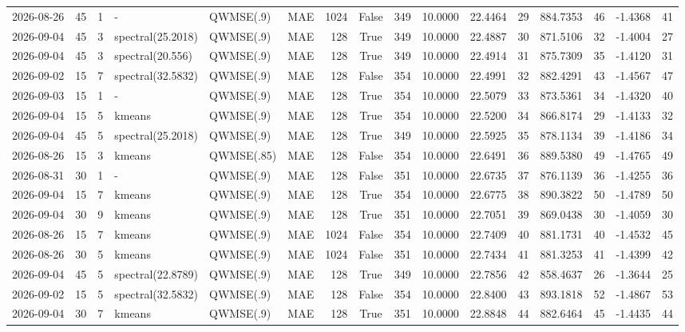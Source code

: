 \documentclass[10pt]{article}
\begin{document}
\begin{landscape}
\begin{longtable}{@{}lrrlllrcrrrrrrrr@{}}
2026-08-26 & 45 & 1 & - & QWMSE(.9) & MAE & 1024 & False & 349 & 10.0000 & 22.4464 & 29 & 884.7353 & 46 & -1.4368 & 41 \\
2026-09-04 & 45 & 3 & spectral(25.2018) & QWMSE(.9) & MAE & 128 & True & 349 & 10.0000 & 22.4887 & 30 & 871.5106 & 32 & -1.4004 & 27 \\
2026-09-04 & 45 & 3 & spectral(20.556) & QWMSE(.9) & MAE & 128 & True & 349 & 10.0000 & 22.4914 & 31 & 875.7309 & 35 & -1.4120 & 31 \\
2026-09-02 & 15 & 7 & spectral(32.5832) & QWMSE(.9) & MAE & 128 & False & 354 & 10.0000 & 22.4991 & 32 & 882.4291 & 43 & -1.4567 & 47 \\
2026-09-03 & 15 & 1 & - & QWMSE(.9) & MAE & 128 & True & 354 & 10.0000 & 22.5079 & 33 & 873.5361 & 34 & -1.4320 & 40 \\
2026-09-04 & 15 & 5 & kmeans & QWMSE(.9) & MAE & 128 & True & 354 & 10.0000 & 22.5200 & 34 & 866.8174 & 29 & -1.4133 & 32 \\
2026-09-04 & 45 & 5 & spectral(25.2018) & QWMSE(.9) & MAE & 128 & True & 349 & 10.0000 & 22.5925 & 35 & 878.1134 & 39 & -1.4186 & 34 \\
2026-08-26 & 15 & 3 & kmeans & QWMSE(.85) & MAE & 128 & False & 354 & 10.0000 & 22.6491 & 36 & 889.5380 & 49 & -1.4765 & 49 \\
2026-08-31 & 30 & 1 & - & QWMSE(.9) & MAE & 128 & False & 351 & 10.0000 & 22.6735 & 37 & 876.1139 & 36 & -1.4255 & 36 \\
2026-09-04 & 15 & 7 & kmeans & QWMSE(.9) & MAE & 128 & True & 354 & 10.0000 & 22.6775 & 38 & 890.3822 & 50 & -1.4789 & 50 \\
2026-09-04 & 30 & 9 & kmeans & QWMSE(.9) & MAE & 128 & True & 351 & 10.0000 & 22.7051 & 39 & 869.0438 & 30 & -1.4059 & 30 \\
2026-08-26 & 15 & 7 & kmeans & QWMSE(.9) & MAE & 1024 & False & 354 & 10.0000 & 22.7409 & 40 & 881.1731 & 40 & -1.4532 & 45 \\
2026-08-26 & 30 & 5 & kmeans & QWMSE(.9) & MAE & 1024 & False & 351 & 10.0000 & 22.7434 & 41 & 881.3253 & 41 & -1.4399 & 42 \\
2026-09-04 & 45 & 5 & spectral(22.8789) & QWMSE(.9) & MAE & 128 & True & 349 & 10.0000 & 22.7856 & 42 & 858.4637 & 26 & -1.3644 & 25 \\
2026-09-02 & 15 & 5 & spectral(32.5832) & QWMSE(.9) & MAE & 128 & False & 354 & 10.0000 & 22.8400 & 43 & 893.1818 & 52 & -1.4867 & 53 \\
2026-09-04 & 30 & 7 & kmeans & QWMSE(.9) & MAE & 128 & True & 351 & 10.0000 & 22.8848 & 44 & 882.6464 & 45 & -1.4435 & 44 \\

\end{longtable}
\end{landscape}
\end{document}
